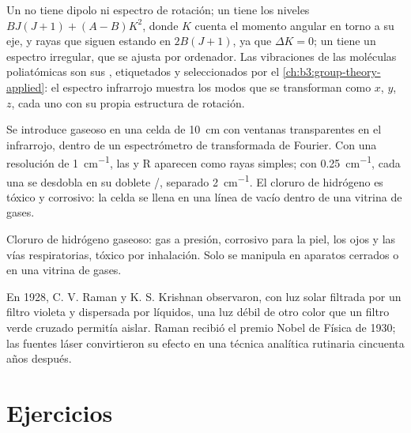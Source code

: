 Un  no tiene dipolo ni espectro de rotación; un  tiene los
niveles $BJ(J+1) + (A - B)K^2$, donde $K$ cuenta el momento angular en torno a su eje,
y rayas que siguen estando en $2B(J+1)$, ya que $\Delta K = 0$; un 
tiene un espectro irregular, que se ajusta por ordenador. Las vibraciones de las moléculas
poliatómicas son sus , etiquetados y seleccionados por el
\cref{ch:b3:group-theory-applied}: el espectro infrarrojo muestra los modos
que se transforman como $x$, $y$, $z$, cada uno con su propia estructura de rotación.

\begin{inthelab}
Se introduce  gaseoso en una celda de \qty{10}{cm} con ventanas transparentes en
el infrarrojo, dentro de un espectrómetro de transformada de Fourier. Con una resolución de
\qty{1}{cm^{-1}}, las  y R aparecen como rayas simples; con \qty{0.25}{cm^{-1}}, cada una
se desdobla en su doblete /, separado \qty{2}{cm^{-1}}. El cloruro de
hidrógeno es tóxico y corrosivo: la celda se llena en una línea de vacío dentro de una vitrina
de gases.
\end{inthelab}

\begin{safety}{}
Cloruro de hidrógeno gaseoso: gas a presión, corrosivo para la piel, los ojos y las
vías respiratorias, tóxico por inhalación. Solo se manipula en aparatos cerrados o en una
vitrina de gases.
\end{safety}

\begin{history}[Raman, 1928]
En 1928, C. V. Raman y K. S. Krishnan observaron, con luz solar filtrada por
un filtro violeta y dispersada por líquidos, una luz débil de otro color
que un filtro verde cruzado permitía aislar. Raman recibió el premio Nobel de
Física de 1930; las fuentes láser convirtieron su efecto en una técnica analítica
rutinaria cincuenta años después.
\end{history}

\section{Ejercicios}

